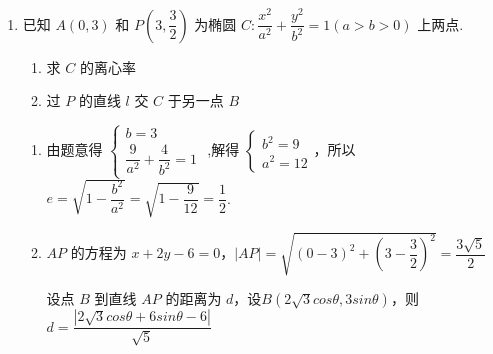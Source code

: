 \begin{enumerate}
        \item 已知 $A\left( {0,3}\right)$ 和 $P\left( {3,\dfrac{3}{2}}\right)$ 为椭圆 $C : \dfrac{{x}^{2}}{{a}^{2}} + \dfrac{{y}^{2}}{{b}^{2}} = 1\left( {a > b > 0}\right)$ 上两点.
        \begin{enumerate}
            \item 求 $C$ 的离心率
            \item 过 $P$ 的直线 $l$ 交 $C$ 于另一点 $B$
        \end{enumerate}
        \begin{jieda}
            \begin{enumerate}
                \item 由题意得 $\left\{  \begin{matrix} b = 3 \\  \dfrac{9}{{a}^{2}} + \dfrac{4}{{b}^{2}} = 1 \end{matrix}\right.$ ,解得 $\left\{  \begin{matrix} {b}^{2} = 9 \\  {a}^{2} = {12} \end{matrix}\right.$，所以 $e = \sqrt{1 - \dfrac{{b}^{2}}{{a}^{2}}} = \sqrt{1 - \dfrac{9}{12}} = \dfrac{1}{2}$.
                \item ${AP}$ 的方程为 $x + {2y} - 6 = 0$，$\left| {AP}\right|  = \sqrt{{\left( 0 - 3\right) }^{2} + {\left( 3 - \dfrac{3}{2}\right) }^{2}} = \dfrac{3\sqrt{5}}{2}$
                
                设点 $B$ 到直线 ${AP}$ 的距离为 $d$，设$B(2\sqrt{3}cos\theta, 3sin\theta)$，则$d = \dfrac{|2\sqrt{3}cos\theta+6sin\theta-6|}{\sqrt{5}}$
\end{enumerate}
\end{jieda}
\end{enumerate}
